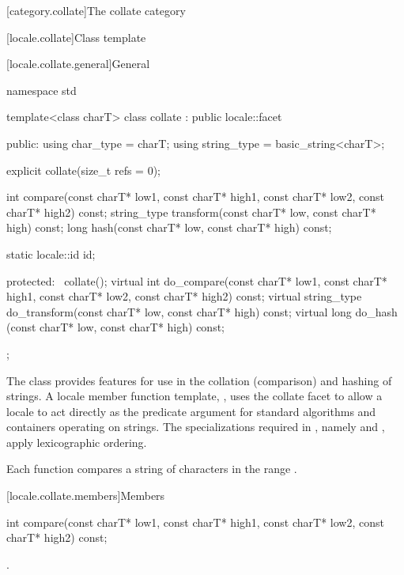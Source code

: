 [category.collate]{The collate category}

[locale.collate]{Class template }

[locale.collate.general]{General}

%
\begin{codeblock}
namespace std {
  template<class charT>
    class collate : public locale::facet {
    public:
      using char_type   = charT;
      using string_type = basic_string<charT>;

      explicit collate(size_t refs = 0);

      int compare(const charT* low1, const charT* high1,
                  const charT* low2, const charT* high2) const;
      string_type transform(const charT* low, const charT* high) const;
      long hash(const charT* low, const charT* high) const;

      static locale::id id;

    protected:
      ~collate();
      virtual int do_compare(const charT* low1, const charT* high1,
                             const charT* low2, const charT* high2) const;
      virtual string_type do_transform(const charT* low, const charT* high) const;
      virtual long do_hash (const charT* low, const charT* high) const;
    };
}
\end{codeblock}

\pnum
The class  provides features
for use in the collation (comparison) and hashing of strings.
A locale member function template, ,
uses the collate facet to allow a locale to act directly as
the predicate argument for standard algorithms and
containers operating on strings.
The specializations
required in ,
namely  and ,
apply lexicographic ordering.

\pnum
Each function compares a string of characters 
in the range .

[locale.collate.members]{Members}

%
\begin{itemdecl}
int compare(const charT* low1, const charT* high1,
            const charT* low2, const charT* high2) const;
\end{itemdecl}

\begin{itemdescr}
\pnum
\returns
{}.
\end{itemdescr}

